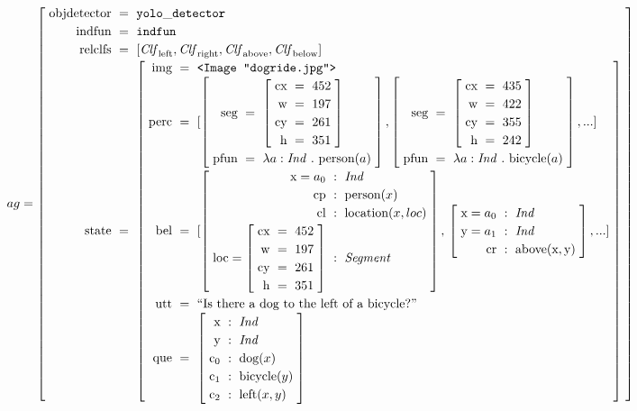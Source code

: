 \begin{landscape}
\begin{equation}\label{eq:ag}
\def\arraystretch{1.2}
ag =
\rec{
    \text{objdetector} &=& \mathtt{yolo\_detector} \\
    \text{indfun} &=& \mathtt{indfun} \\
    \text{relclfs} &=& [\type{Clf}_\text{left}, \type{Clf}_\text{right}, \type{Clf}_\text{above}, \type{Clf}_\text{below}] \\
    \text{state} &=& \rec{
		\text{img} &=& \text{\tt <Image "dogride.jpg">} \\
		\text{perc} &=& [
			\rec{
				\text{seg} &=& \rec{
					\text{cx} &=& 452\\
					\text{w} &=& 197\\
					\text{cy} &=& 261 \\
					\text{h} &=& 351\\
					}\\
				\text{pfun} &=& \lambda a:\type{Ind}\ .\ \text{person}(a)
				},
			\rec{
				\text{seg} &=& \rec{
					\text{cx} &=& 435\\
					\text{w} &=& 422\\
					\text{cy} &=& 355 \\
					\text{h} &=& 242\\
					}\\
				\text{pfun} &=& \lambda a:\type{Ind}\ .\ \text{bicycle}(a)
				},
			... ] \\
		\text{bel} &=& [
			\rec{
				\text{x} = a_0 &:& \type{Ind}\\
				\text{cp} &:& \text{person}(x)\\
				\text{cl} &:& \text{location}(x, loc)\\
				\text{loc} = \rec{
					\text{cx} &=& 452\\
					\text{w} &=& 197\\
					\text{cy} &=& 261 \\
					\text{h} &=& 351\\
					}
					&:& \type{Segment} \\
				},
			{}{} \rec{
				\text{x} = a_0 &:& \type{Ind} \\
				\text{y} = a_1 &:& \type{Ind} \\
				\text{cr} &:& \text{above}(\text{x}, \text{y})
				},
			... ] \\
        \text{utt} &=& \text{``Is there a dog to the left of a bicycle?''} \\
		\text{que} &=& \rec{
			\text{x} &:& \type{Ind}\\
			\text{y} &:& \type{Ind}\\
			\text{c}_\text{0} &:& \text{dog}(x)\\
			\text{c}_\text{1} &:& \text{bicycle}(y)\\
			\text{c}_\text{2} &:& \text{left}(x, y)\\
			} \\
		} \\
    }
\end{equation}
\end{landscape}



